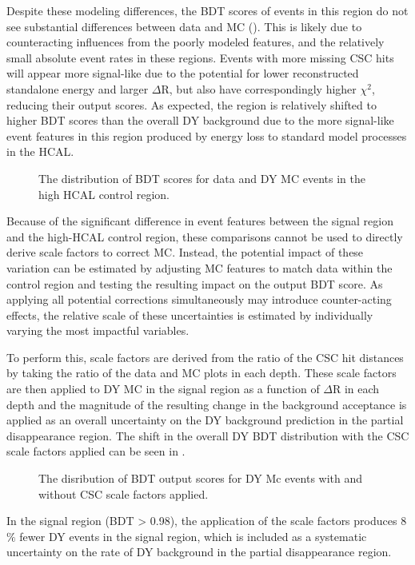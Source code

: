 Despite these modeling differences, the BDT scores of events in this region do not see substantial differences between data and MC ().
This is likely due to counteracting influences from the poorly modeled features, and the relatively small absolute event rates in these regions. 
Events with more missing CSC hits will appear more signal-like due to the potential for lower reconstructed standalone energy and larger $\Delta$R, but also have correspondingly higher $\chi^{2}$, reducing their output scores.
As expected, the region is relatively shifted to higher BDT scores than the overall DY background due to the more signal-like event features in this region produced by energy loss to standard model processes in the HCAL. 

\begin{figure}[htbp]
	\label{fig:BDTscorevalid}
	\centering
        \caption[BDT Validation in the High HCAL Energy Control Region]{The distribution of BDT scores for data and DY MC events in the high HCAL control region.}
\end{figure}

Because of the significant difference in event features between the signal region and the high-HCAL control region, these comparisons cannot be used to directly derive scale factors to correct MC. 
Instead, the potential impact of these variation can be estimated by adjusting MC features to match data within the control region and testing the resulting impact on the output BDT score.
As applying all potential corrections simultaneously may introduce counter-acting effects, the relative scale of these uncertainties is estimated by individually varying the most impactful variables.

To perform this, scale factors are derived from the ratio of the CSC hit distances by taking the ratio of the data and MC plots in each depth. 
These scale factors are then applied to DY MC in the signal region as a function of $\Delta$R in each depth and the magnitude of the resulting change in the background acceptance is applied as an overall uncertainty on the DY background prediction in the partial disappearance region. 
The shift in the overall DY BDT distribution with the CSC scale factors applied can be seen in .

\begin{figure}[htbp]
	\label{fig:BDTsfvalid}
	\centering
        \caption[BDT Score Variance with Applied CSC Scale Factors]{The disribution of BDT output scores for DY Mc events with and without CSC scale factors applied.}
\end{figure}

In the signal region (BDT > 0.98), the application of the scale factors produces 8$\%$ fewer DY events in the signal region, which is included as a systematic
uncertainty on the rate of DY background in the partial disappearance region. 


